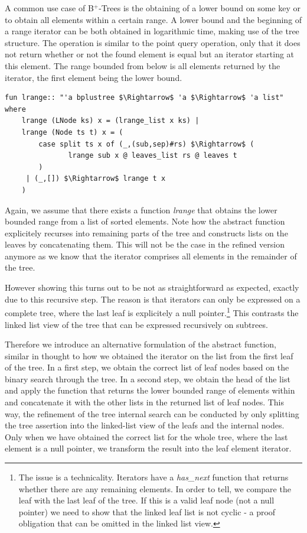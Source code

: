 \documentclass[a4paper,UKenglish,cleveref, autoref, thm-restate]{lipics-v2021}
\newcommand{\btrees}{B$^+$-Trees}
\begin{document}
A common use case of \btrees
is the obtaining of a lower bound on some key
or to obtain  all elements within a certain range. \cite{DBLP:journals/ftdb/Graefe11}
A lower bound and the beginning of a range iterator
can be both obtained in logarithmic time, making use of the tree structure.
The operation is similar to the point query operation,
only that it does not return whether or not the
found element is equal but an iterator starting at this element.
The range bounded from below is all elements returned by the iterator,
the first element being the lower bound.

\begin{lstlisting}[mathescape=true, language=Isabelle,label=lst:btree-lrange]
fun lrange:: "'a bplustree $\Rightarrow$ 'a $\Rightarrow$ 'a list" where
    lrange (LNode ks) x = (lrange_list x ks) |
    lrange (Node ts t) x = (
        case split ts x of (_,(sub,sep)#rs) $\Rightarrow$ (
               lrange sub x @ leaves_list rs @ leaves t
        )
     | (_,[]) $\Rightarrow$ lrange t x
    )
\end{lstlisting}
  
Again, we assume that there exists a function \textit{lrange} that
obtains the lower bounded range from a list of sorted elements.
Note how the abstract function explicitely recurses into
remaining parts of the tree and constructs lists on the leaves by concatenating them.
This will not be the case in the refined version anymore
as we know that the iterator comprises all elements in the remainder of the tree.

However showing this turns out to be not as straightforward
as expected, exactly due to this recursive step.
The reason is that iterators can only be expressed on a complete tree,
where the last leaf is explicitely a null pointer.\footnote{
    The issue is a technicality. Iterators have a \textit{has\_next} function
    that returns whether there are any remaining elements.
    In order to tell, we compare the leaf with the last leaf of the tree.
    If this is a valid leaf node (not a null pointer) we need to show
    that the linked leaf list is not cyclic - a proof obligation
    that can be omitted in the linked list view.
}
This contrasts the linked list view of the tree that can be expressed
recursively on subtrees.

Therefore we introduce an alternative formulation of the
abstract function, similar in thought to how we obtained the iterator
on the list from the first leaf of the tree.
In a first step, we obtain the correct list of leaf nodes
based on the binary search through the tree.
In a second step, we obtain the head of the list and apply
the function that returns the lower bounded range of elements within
and concatenate it with the other lists in the returned list of leaf nodes.
This way, the refinement of the tree internal search
can be conducted by only splitting the tree assertion into the linked-list view of the leafs
and the internal nodes.
Only when we have obtained the correct list for the whole tree,
where the last element is a null pointer,
we transform the result into the leaf element iterator.
\end{document}

